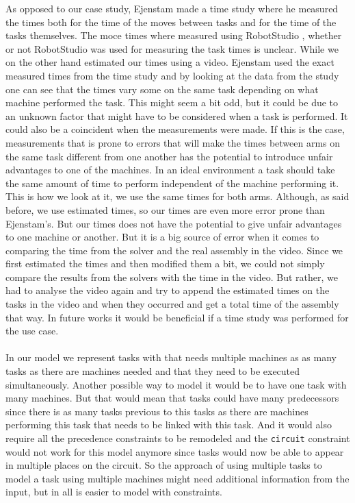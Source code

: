 As opposed to our case study, Ejenstam made a time study where he measured the times both for the time of the moves between tasks and for the time of the tasks themselves. The moce times where measured using RobotStudio \cite{robotstudio}, whether or not RobotStudio was used for measuring the task times is unclear. While we on the other hand estimated our times using a video. Ejenstam used the exact measured times from the time study and by looking at the data from the study one can see that the times vary some on the same task depending on what machine performed the task. This might seem a bit odd, but it could be due to an unknown factor that might have to be considered when a task is performed. It could also be a coincident when the measurements were made. If this is the case, measurements that is prone to errors that will make the times between arms on the same task different from one another has the potential to introduce unfair advantages to one of the machines. In an ideal environment a task should take the same amount of time to perform independent of the machine performing it. This is how we look at it, we use the same times for both arms. Although, as said before, we use estimated times, so our times are even more error prone than Ejenstam's. But our times does not have the potential to give unfair advantages to one machine or another. But it is a big source of error when it comes to comparing the time from the solver and the real assembly in the video. Since we first estimated the times and then modified them a bit, we could not simply compare the results from the solvers with the time in the video. But rather, we had to analyse the video again and try to append the estimated times on the tasks in the video and when they occurred and get a total time of the assembly that way. In future works it would be beneficial if a time study was performed for the use case.
\\\\
In our model we represent tasks with that needs multiple machines as as many tasks as there are machines needed and that they need to be executed simultaneously. Another possible way to model it would be to have one task with many machines. But that would mean that tasks could have many predecessors since there is as many tasks previous to this tasks as there are machines performing this task that needs to be linked with this task. And it would also require all the precedence constraints to be remodeled and the \texttt{circuit} constraint would not work for this model anymore since tasks would now be able to appear in multiple places on the circuit. So the approach of using multiple tasks to model a task using multiple machines might need additional information from the input, but in all is easier to model with constraints.

